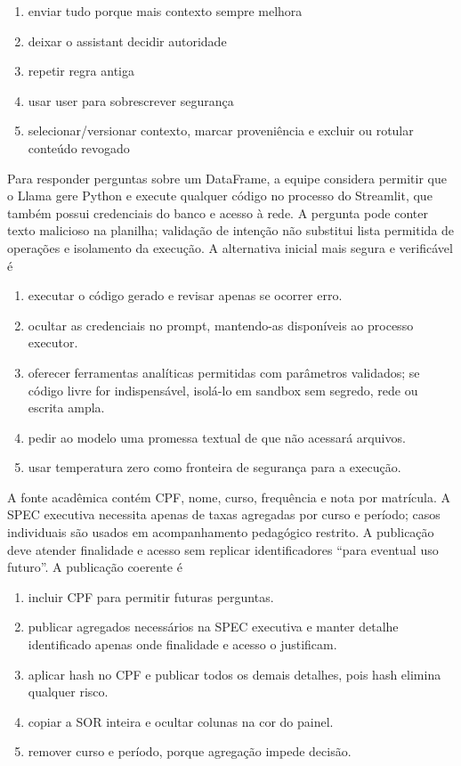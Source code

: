 \documentclass[12pt,a4paper]{article}
\begin{document}
\begin{enumerate}[label=\Alph*)]
  \item enviar tudo porque mais contexto sempre melhora
  \item deixar o assistant decidir autoridade
  \item repetir regra antiga
  \item usar user para sobrescrever segurança
  \item selecionar/versionar contexto, marcar proveniência e excluir ou rotular conteúdo revogado
\end{enumerate}

\TextoBase
Para responder perguntas sobre um DataFrame, a equipe considera permitir que o Llama gere Python e execute qualquer código no processo do Streamlit, que também possui credenciais do banco e acesso à rede.
A pergunta pode conter texto malicioso na planilha; validação de intenção não substitui lista permitida de operações e isolamento da execução.
\FonteDidatica
\Comando A alternativa inicial mais segura e verificável é
\begin{enumerate}[label=\Alph*)]
  \item executar o código gerado e revisar apenas se ocorrer erro.
  \item ocultar as credenciais no prompt, mantendo-as disponíveis ao processo executor.
  \item oferecer ferramentas analíticas permitidas com parâmetros validados; se código livre for indispensável, isolá-lo em sandbox sem segredo, rede ou escrita ampla.
  \item pedir ao modelo uma promessa textual de que não acessará arquivos.
  \item usar temperatura zero como fronteira de segurança para a execução.
\end{enumerate}

\TextoBase A fonte acadêmica contém CPF, nome, curso, frequência e nota por matrícula. A SPEC executiva necessita apenas de taxas agregadas por curso e período; casos individuais são usados em acompanhamento pedagógico restrito. A publicação deve atender finalidade e acesso sem replicar identificadores ``para eventual uso futuro''.
\FonteDidatica
\Comando A publicação coerente é
\begin{enumerate}[label=\Alph*)]
  \item incluir CPF para permitir futuras perguntas.
  \item publicar agregados necessários na SPEC executiva e manter detalhe identificado apenas onde finalidade e acesso o justificam.
  \item aplicar hash no CPF e publicar todos os demais detalhes, pois hash elimina qualquer risco.
  \item copiar a SOR inteira e ocultar colunas na cor do painel.
  \item remover curso e período, porque agregação impede decisão.
\end{enumerate}
\end{document}
